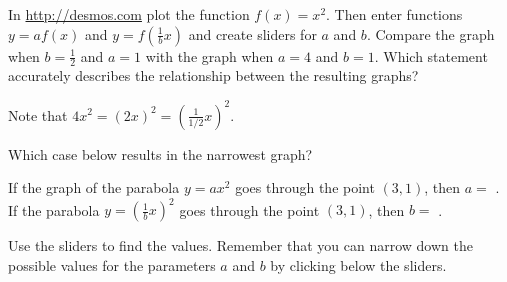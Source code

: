 \documentclass{ximera}
\begin{document}
\begin{question}
In \href{http://desmos.com}{http://desmos.com} plot the function $f(x)=x^2$. Then enter functions $y=af(x)$ and $y=f\left(\frac{1}{b}x\right)$ and create sliders for $a$ and $b$. Compare the graph when $b=\frac{1}{2}$ and $a=1$ with the graph when $a=4$ and $b=1$. Which statement accurately describes the relationship between the resulting graphs?

    \begin{multipleChoice}
    \end{multipleChoice}
    \begin{hint}
    Note that $4x^2=(2x)^2=\left(\frac{1}{1/2}x\right)^2$.
    \end{hint}
Which case below results in the narrowest graph?
	\begin{multipleChoice}
    \end{multipleChoice}
    
If the graph of the parabola $y=ax^2$ goes through the point $(3,1)$, then $a=$ . If the parabola $y=\left(\frac{1}{b}x\right)^2$ goes through the point $(3,1)$, then $b=$ .  
	\begin{hint}
    Use the sliders to find the values. Remember that you can narrow down the possible values for the parameters $a$ and $b$ by clicking below the sliders.
    \end{hint}

\end{question}
\end{document}
